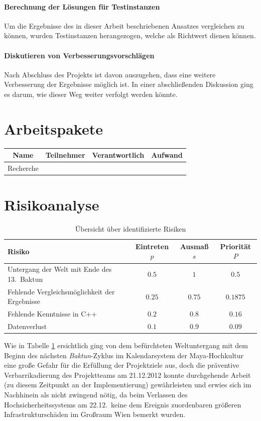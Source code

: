 \paragraph{Berechnung der Lösungen für Testinstanzen}{Um die Ergebnisse des in dieser Arbeit beschriebenen Ansatzes vergleichen zu können, wurden Testinstanzen herangezogen, welche als Richtwert dienen können.}
\paragraph{Diskutieren von Verbesserungsvorschlägen}{Nach Abschluss des Projekts ist davon auszugehen, dass eine weitere Verbesserung der Ergebnisse möglich ist. In einer abschließenden Diskussion ging es darum, wie dieser Weg weiter verfolgt werden könnte.}

\section{Arbeitspakete}
\label{sec:arbeitspakete}

\begin{tabular}{cccc}
	Name & Teilnehmer & Verantwortlich & Aufwand \\
	\hline\hline\hline
	Recherche & & & \\
	\hline\hline
\end{tabular}

\section{Risikoanalyse}
\begin{table}
\centering
\begin{tabular}{lccc}
Risiko & Eintreten $p$ & Ausmaß $s$ & Priorität $P$\\
\hline
Untergang der Welt mit Ende des 13.\ Baktun & $0.5$ & $1$ & $0.5$\\
Fehlende Vergleichsmöglichkeit der Ergebnisse & $0.25$ & $0.75$ & $0.1875$ \\
Fehlende Kenntnisse in C++ & $0.2$ & $0.8$ & $0.16$ \\
Datenverlust & $0.1$ & $0.9$ & $0.09$ \\
\end{tabular}
\caption{Übersicht über identifizierte Risiken}
\label{tab:risk}
\end{table}

Wie in Tabelle \ref{tab:risk} ersichtlich ging von dem befürchteten Weltuntergang mit dem Beginn des nächsten \textit{Baktun}-Zyklus im Kalendarsystem der Maya-Hochkultur eine große Gefahr für die Erfüllung der Projektziele aus, doch die präventive Verbarrikadierung des Projektteams am 21.12.2012 konnte  durchgehende Arbeit (zu diesem Zeitpunkt an der Implementierung) gewährleisten und erwies sich im Nachhinein als nicht zwingend nötig, da beim Verlassen des Hochsicherheitssystems am 22.12.\ keine dem Ereignis zuordenbaren größeren Infrastrukturschäden im Großraum Wien bemerkt wurden.

